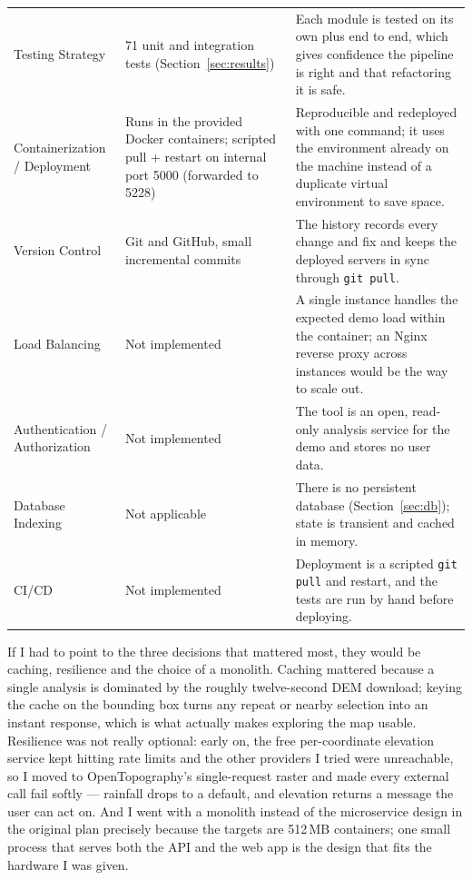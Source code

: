\documentclass[manuscript,screen]{acmart}
\begin{document}
\begin{table}[t]
\begin{tabular}{p{2.8cm}p{5.2cm}p{6.5cm}}
    Testing Strategy & 71 unit and integration tests (Section~\ref{sec:results}) & Each module is tested on its own plus end to end, which gives confidence the pipeline is right and that refactoring it is safe. \\
    Containerization / Deployment & Runs in the provided Docker containers; scripted pull + restart on internal port 5000 (forwarded to 5228) & Reproducible and redeployed with one command; it uses the environment already on the machine instead of a duplicate virtual environment to save space. \\
    Version Control & Git and GitHub, small incremental commits & The history records every change and fix and keeps the deployed servers in sync through \texttt{git pull}. \\
    Load Balancing & Not implemented & A single instance handles the expected demo load within the container; an Nginx reverse proxy across instances would be the way to scale out. \\
    Authentication / Authorization & Not implemented & The tool is an open, read-only analysis service for the demo and stores no user data. \\
    Database Indexing & Not applicable & There is no persistent database (Section~\ref{sec:db}); state is transient and cached in memory. \\
    CI/CD & Not implemented & Deployment is a scripted \texttt{git pull} and restart, and the tests are run by hand before deploying. \\
    \bottomrule
  \end{tabular}
\end{table}

If I had to point to the three decisions that mattered most, they would be caching,
resilience and the choice of a monolith. Caching mattered because a single analysis
is dominated by the roughly twelve-second DEM download; keying the cache on the
bounding box turns any repeat or nearby selection into an instant response, which is
what actually makes exploring the map usable. Resilience was not really optional:
early on, the free per-coordinate elevation service kept hitting rate limits and the
other providers I tried were unreachable, so I moved to OpenTopography's
single-request raster and made every external call fail softly --- rainfall drops to
a default, and elevation returns a message the user can act on. And I went with a
monolith instead of the microservice design in the original plan precisely because
the targets are 512\,MB containers; one small process that serves both the API and
the web app is the design that fits the hardware I was given.
\end{document}
